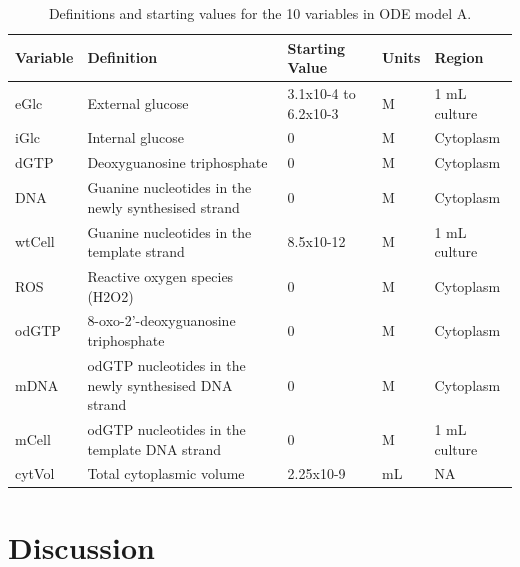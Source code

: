 \documentclass[
  12pt,
  letterpaper,
  DIV=11,
  numbers=noendperiod]{scrreprt}
\begin{document}
\begin{table}

\caption{\label{tbl-one}Definitions and starting values for the 10
variables in ODE model A.}\begin{minipage}[t]{\linewidth}

{\centering 

\begin{tabular}[t]{lllll}
\toprule
Variable & Definition & Starting Value & Units & Region\\
\midrule
eGlc & External glucose & 3.1x10-4 to 6.2x10-3 & M & 1 mL culture\\
iGlc & Internal glucose & 0 & M & Cytoplasm\\
dGTP & Deoxyguanosine triphosphate & 0 & M & Cytoplasm\\
DNA & Guanine nucleotides in the newly synthesised
strand & 0 & M & Cytoplasm\\
wtCell & Guanine nucleotides in the template strand & 8.5x10-12 & M & 1
mL culture\\
ROS & Reactive oxygen species (H2O2) & 0 & M & Cytoplasm\\
odGTP & 8-oxo-2'-deoxyguanosine triphosphate & 0 & M & Cytoplasm\\
mDNA & odGTP nucleotides in the newly synthesised DNA
strand & 0 & M & Cytoplasm\\
mCell & odGTP nucleotides in the template DNA strand & 0 & M & 1 mL
culture\\
cytVol & Total cytoplasmic volume & 2.25x10-9 & mL & NA\\
\bottomrule
\end{tabular}

}

\end{minipage}%

\end{table}


\hypertarget{discussion}{%
\chapter{Discussion}\label{discussion}}
\end{document}
